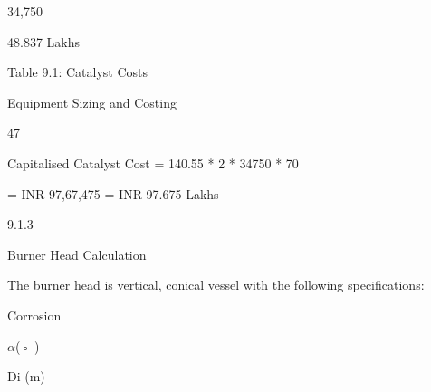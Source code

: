 \documentclass[a4paper,portrait,12pt]{article}
\begin{document}
34,750





\begin{flushleft}
48.837 Lakhs
\end{flushleft}





\begin{flushleft}
Table 9.1: Catalyst Costs
\end{flushleft}





\begin{flushleft}
\newpage
Equipment Sizing and Costing
\end{flushleft}





47





\begin{flushleft}
Capitalised Catalyst Cost = 140.55 * 2 * 34750 * 70
\end{flushleft}


\begin{flushleft}
= INR 97,67,475 = INR 97.675 Lakhs
\end{flushleft}





9.1.3





\begin{flushleft}
Burner Head Calculation
\end{flushleft}





\begin{flushleft}
The burner head is vertical, conical vessel with the following specifications:
\end{flushleft}


\begin{flushleft}
Corrosion
\end{flushleft}


\begin{flushleft}
$\alpha$(◦ )
\end{flushleft}





\begin{flushleft}
Di (m)
\end{flushleft}
\end{document}
